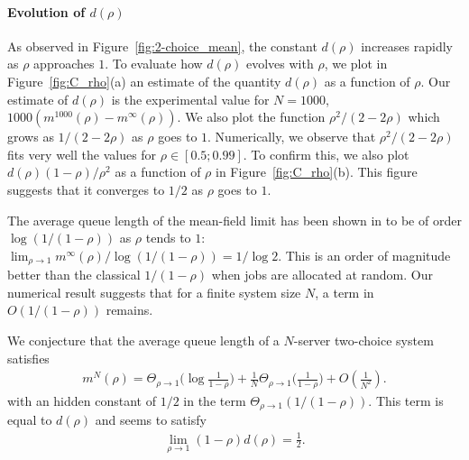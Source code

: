 \documentclass[sigconf]{acmart}
\newcommand\p[1]{\left(#1\right)}
\begin{document}
\paragraph*{Evolution of $d(\rho)$}
As observed in Figure~\ref{fig:2-choice_mean}, the constant $d(\rho)$
increases rapidly as $\rho$ approaches $1$.  To evaluate how $d(\rho)$
evolves with $\rho$, we plot in Figure~\ref{fig:C_rho}(a) an estimate
of the quantity $d(\rho)$ as a function of $\rho$. Our estimate of
$d(\rho)$ is the experimental value for $N=1000$,
$1000(m^{1000}(\rho)-m^\infty(\rho))$.  We also plot the function
$\rho^2/(2-2\rho)$ which grows as $1/(2-2\rho)$ as $\rho$ goes to $1$.
Numerically, we observe that $\rho^2/(2-2\rho)$ fits very well the
values for $\rho\in[0.5;0.99]$. To confirm this, we also plot
$d(\rho)(1-\rho)/\rho^2$ as a function of $\rho$ in
Figure~\ref{fig:C_rho}(b). This figure suggests that it converges to
$1/2$ as $\rho$ goes to $1$.

The average queue length of the mean-field limit has been shown in
\cite{mitzenmacher1996power} to be of order $\log (1/(1-\rho))$ as
$\rho$ tends to $1$:
$\lim_{\rho\to1}m^\infty(\rho) / \log(1/(1-\rho)) = 1/\log2$.
This is an order of magnitude better than the classical $1/(1-\rho)$
when jobs are allocated at random. Our numerical result suggests that
for a finite system size $N$, a term in $O(1/(1-\rho))$ remains.

We conjecture that the average queue length of a $N$-server two-choice
system satisfies 
\begin{align*}
  m^N(\rho) = \Theta_{\rho\to1}\Big(\log\frac1{1-\rho}\Big)
  + \frac{1}{N}\Theta_{\rho\to1}\Big(\frac{1}{1-\rho}\Big) +
  O\p{\frac1{N^2}}. 
\end{align*}
with an hidden constant of $1/2$ in the term
$\Theta_{\rho\to1}(1/(1-\rho))$. This term is equal to $d(\rho)$ and
seems to satisfy
\begin{align*}
  \lim_{\rho\to1}  (1-\rho) d(\rho)  = \frac12.
\end{align*}
\end{document}
